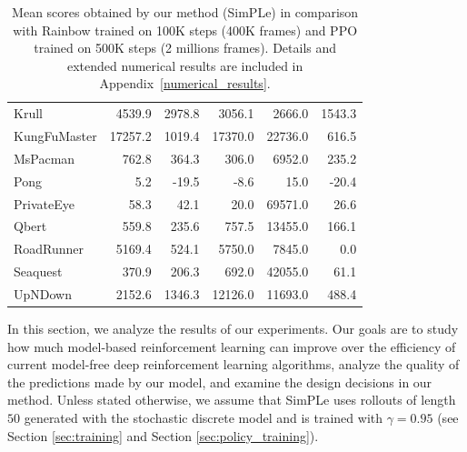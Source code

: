 \begin{table}
\begin{tabular}{l|r|r|r|r|r}
Krull          &   4539.9 &   2978.8 &   3056.1 &   2666.0 &  1543.3 \\
KungFuMaster   &  17257.2 &   1019.4 &  17370.0 &  22736.0 &   616.5 \\
MsPacman       &    762.8 &    364.3 &    306.0 &   6952.0 &   235.2 \\
Pong           &      5.2 &    -19.5 &     -8.6 &     15.0 &   -20.4 \\
PrivateEye     &     58.3 &     42.1 &     20.0 &  69571.0 &    26.6 \\
Qbert          &    559.8 &    235.6 &    757.5 &  13455.0 &   166.1 \\
RoadRunner     &   5169.4 &    524.1 &   5750.0 &   7845.0 &     0.0 \\
Seaquest       &    370.9 &    206.3 &    692.0 &  42055.0 &    61.1 \\
UpNDown        &   2152.6 &   1346.3 &  12126.0 &  11693.0 &   488.4 \\

\end{tabular}
\caption{Mean scores obtained by our method (SimPLe) in comparison with Rainbow trained on 100K steps (400K frames) and PPO trained on 500K steps (2 millions frames). Details and extended numerical results are included in Appendix~\ref{numerical_results}.}
\label{tab:shortNumericalResults}
\end{table}

In this section, we analyze the results of our experiments. Our goals are to study how much model-based reinforcement learning can improve over the efficiency of current model-free deep reinforcement learning algorithms, analyze the quality of the predictions made by our model, and examine the design decisions in our method. Unless stated otherwise, we assume that SimPLe uses rollouts of length $50$ generated with the stochastic discrete model and is trained with $\gamma=0.95$ (see Section \ref{sec:training} and Section \ref{sec:policy_training}). 

